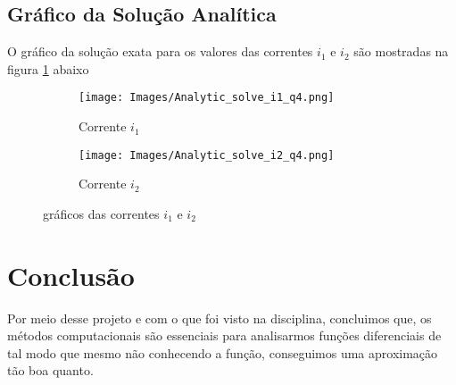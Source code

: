 \documentclass[12pt]{article}
\begin{document}
\subsection{Gráfico da Solução Analítica}
O gráfico da solução exata para os valores das correntes $i_1$ e $i_2$ são mostradas na figura \ref{i:i1i2} abaixo

\begin{figure}[H]
\begin{subfigure}{.4\textwidth}
  \centering
  \texttt{[image: Images/Analytic\_solve\_i1\_q4.png]}
  \caption{Corrente $i_1$}
\end{subfigure}
\begin{subfigure}{.4\textwidth}
  \centering
  \texttt{[image: Images/Analytic\_solve\_i2\_q4.png]}
  \caption{Corrente $i_2$}
\end{subfigure}

\caption{gráficos das correntes $i_1$ e $i_2$}
\label{i:i1i2}
\end{figure}

\section{Conclusão}
Por meio desse projeto e com o que foi visto na disciplina, concluimos que, os métodos computacionais são essenciais para analisarmos funções diferenciais de tal modo que mesmo não conhecendo a função, conseguimos uma aproximação tão boa quanto.
\end{document}
